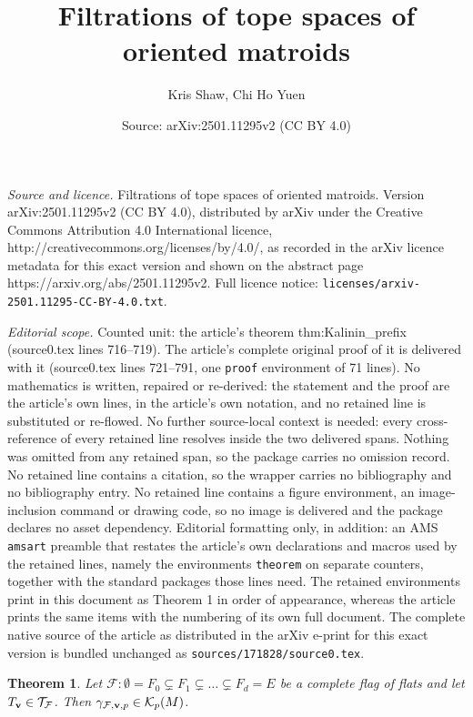 \documentclass[10pt,a4paper]{amsart}
\title{Filtrations of tope spaces of oriented matroids}
\author{Kris Shaw, Chi Ho Yuen}
\date{Source: arXiv:2501.11295v2 (CC BY 4.0)}
\newtheorem{theorem}{Theorem}
\newcommand\Fcal{{\mathcal F}}
\newcommand\Kcal{{\mathcal K}}
\newcommand\Tcal{{\mathcal T}}
\newcommand\vv{{\bf v}}
\begin{document}
\maketitle

\noindent\emph{Source and licence.} Filtrations of tope spaces of oriented matroids. Version arXiv:2501.11295v2 (CC BY 4.0), distributed by arXiv under the Creative Commons Attribution 4.0 International licence, http://creativecommons.org/licenses/by/4.0/, as recorded in the arXiv licence metadata for this exact version and shown on the abstract page https://arxiv.org/abs/2501.11295v2. Full licence notice: \texttt{licenses/arxiv-2501.11295-CC-BY-4.0.txt}.\par\smallskip

\noindent\textit{Editorial scope.} Counted unit: the article's theorem thm:Kalinin\_prefix (source0.tex lines 716--719). The article's complete original proof of it is delivered with it (source0.tex lines 721--791, one \texttt{proof} environment of 71 lines). No mathematics is written, repaired or re-derived: the statement and the proof are the article's own lines, in the article's own notation, and no retained line is substituted or re-flowed.  No further source-local context is needed: every cross-reference of every retained line resolves inside the two delivered spans.  Nothing was omitted from any retained span, so the package carries no omission record.  No retained line contains a citation, so the wrapper carries no bibliography and no bibliography entry.  No retained line contains a figure environment, an image-inclusion command or drawing code, so no image is delivered and the package declares no asset dependency.  Editorial formatting only, in addition: an AMS \texttt{amsart} preamble that restates the article's own declarations and macros used by the retained lines, namely the environments \texttt{theorem} on separate counters, together with the standard packages those lines need.  The retained environments print in this document as Theorem 1 in order of appearance, whereas the article prints the same items with the numbering of its own full document.  The complete native source of the article as distributed in the arXiv e-print for this exact version is bundled unchanged as \texttt{sources/171828/source0.tex}.
\begin{theorem} \label{thm:Kalinin_prefix}
Let $\Fcal:\emptyset=F_0 \subsetneq  F_1 \subsetneq \ldots \subsetneq F_d=E$ be a complete flag of flats and let $T_{\vv}\in\Tcal_\Fcal$.
Then $\gamma_{\Fcal,\vv,p}\in\Kcal_p(M)$.
\end{theorem}
\end{document}
